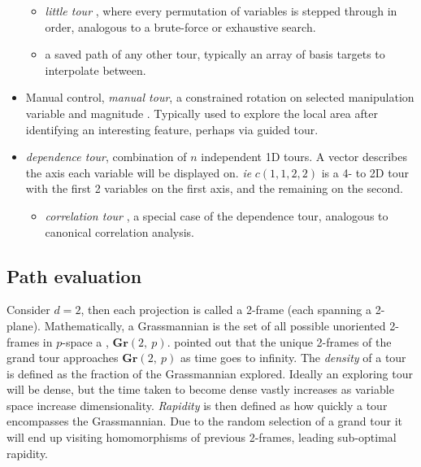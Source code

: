 \documentclass{monashthesis}
\begin{document}
\begin{itemize}
  \begin{itemize}
  \tightlist
  \item
    \emph{little tour} \autocite{mcdonald_interactive_1982}, where every
    permutation of variables is stepped through in order, analogous to a
    brute-force or exhaustive search.
  \item
    a saved path of any other tour, typically an array of basis targets
    to interpolate between.
  \end{itemize}
\item
  Manual control, \emph{manual tour}, a constrained rotation on selected
  manipulation variable and magnitude \autocite{cook_manual_1997}.
  Typically used to explore the local area after identifying an
  interesting feature, perhaps via guided tour.
\item
  \emph{dependence tour}, combination of \(n\) independent 1D tours. A
  vector describes the axis each variable will be displayed on.
  \emph{ie} \(c(1, 1, 2, 2)\) is a 4- to 2D tour with the first 2
  variables on the first axis, and the remaining on the second.

  \begin{itemize}
  \tightlist
  \item
    \emph{correlation tour} \autocite{buja_data_1987}, a special case of
    the dependence tour, analogous to canonical correlation analysis.
  \end{itemize}
\end{itemize}

\subsection{Path evaluation}\label{path-evaluation}

Consider \(d=2\), then each projection is called a 2-frame (each
spanning a 2-plane). Mathematically, a Grassmannian is the set of all
possible unoriented 2-frames in \(p\)-space a , \(\textbf{Gr}(2,~p)\).
\textcite{asimov_grand_1985} pointed out that the unique 2-frames of the
grand tour approaches \(\textbf{Gr}(2,~p)\) as time goes to infinity.
The \emph{density} of a tour is defined as the fraction of the
Grassmannian explored. Ideally an exploring tour will be dense, but the
time taken to become dense vastly increases as variable space increase
dimensionality. \emph{Rapidity} is then defined as how quickly a tour
encompasses the Grassmannian. Due to the random selection of a grand
tour it will end up visiting homomorphisms of previous 2-frames, leading
sub-optimal rapidity.
\end{document}
